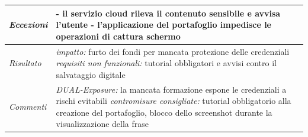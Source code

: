 \begin{longtable}{| >{\columncolor{misuseCol}}p{} | p{} |}
\hline
\textit{Eccezioni} & - il servizio cloud rileva il contenuto sensibile e avvisa l'utente \newline - l'applicazione del portafoglio impedisce le operazioni di cattura schermo \\
\hline
\textit{Risultato} & \textit{impatto:} furto dei fondi per mancata protezione delle credenziali \newline \textit{requisiti non funzionali:} tutorial obbligatori e avvisi contro il salvataggio digitale \\
\hline
\textit{Commenti} & \textit{DUAL-Exposure:} la mancata formazione espone le credenziali a rischi evitabili \newline \textit{contromisure consigliate:} tutorial obbligatorio alla creazione del portafoglio, blocco dello screenshot durante la visualizzazione della frase \\
\hline
\end{longtable}

